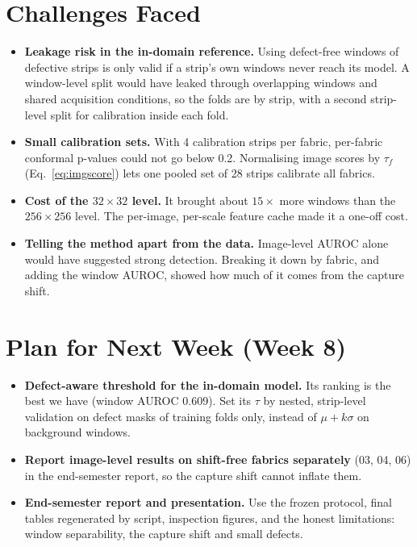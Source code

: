 \documentclass[11pt,a4paper]{article}
\begin{document}
\section*{Challenges Faced}
\begin{itemize}
  \item \textbf{Leakage risk in the in-domain reference.} Using defect-free windows of defective strips is only valid if a strip's own windows never reach its model. A window-level split would have leaked through overlapping windows and shared acquisition conditions, so the folds are by strip, with a second strip-level split for calibration inside each fold.
  \item \textbf{Small calibration sets.} With 4 calibration strips per fabric, per-fabric conformal p-values could not go below 0.2. Normalising image scores by $\tau_f$ (Eq.~\ref{eq:imgscore}) lets one pooled set of 28 strips calibrate all fabrics.
  \item \textbf{Cost of the $32\times32$ level.} It brought about $15\times$ more windows than the $256\times256$ level. The per-image, per-scale feature cache made it a one-off cost.
  \item \textbf{Telling the method apart from the data.} Image-level AUROC alone would have suggested strong detection. Breaking it down by fabric, and adding the window AUROC, showed how much of it comes from the capture shift.
\end{itemize}

\section*{Plan for Next Week (Week 8)}
\begin{itemize}
  \item \textbf{Defect-aware threshold for the in-domain model.} Its ranking is the best we have (window AUROC 0.609). Set its $\tau$ by nested, strip-level validation on defect masks of training folds only, instead of $\mu+k\sigma$ on background windows.
  \item \textbf{Report image-level results on shift-free fabrics separately} (03, 04, 06) in the end-semester report, so the capture shift cannot inflate them.
  \item \textbf{End-semester report and presentation.} Use the frozen protocol, final tables regenerated by script, inspection figures, and the honest limitations: window separability, the capture shift and small defects.
\end{itemize}
\end{document}
